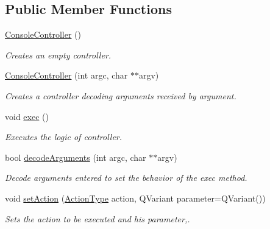 \subsection*{Public Member Functions}
\begin{DoxyCompactItemize}
\item 
\mbox{\label{classConsoleController_aed7f998b076f322a0c45f0a0e57202c4}} 
\mbox{\hyperlink{classConsoleController_aed7f998b076f322a0c45f0a0e57202c4}{Console\+Controller}} ()
\begin{DoxyCompactList}\small\item\em Creates an empty controller. \end{DoxyCompactList}\item 
\mbox{\hyperlink{classConsoleController_aaf8a775d3f675bcf9e7facd959217fdc}{Console\+Controller}} (int argc, char $\ast$$\ast$argv)
\begin{DoxyCompactList}\small\item\em Creates a controller decoding arguments received by argument. \end{DoxyCompactList}\item 
void \mbox{\hyperlink{classConsoleController_accdfd546eef82cfe4d0942426a3b6fac}{exec}} ()
\begin{DoxyCompactList}\small\item\em Executes the logic of controller. \end{DoxyCompactList}\item 
bool \mbox{\hyperlink{classConsoleController_ab9fdcba75eecb1f28c1fcd3b97183fe8}{decode\+Arguments}} (int argc, char $\ast$$\ast$argv)
\begin{DoxyCompactList}\small\item\em Decode arguments entered to set the behavior of the exec method. \end{DoxyCompactList}\item 
void \mbox{\hyperlink{classConsoleController_a13eaf91bd8d72afeaa3792255983e019}{set\+Action}} (\mbox{\hyperlink{classConsoleController_a6bc36e6ee00aa2da0fd9be549b4251d9}{Action\+Type}} action, Q\+Variant parameter=Q\+Variant())
\begin{DoxyCompactList}\small\item\em Sets the action to be executed and his parameter,. \end{DoxyCompactList}\item 
\mbox{\label{classConsoleController_a771c221ac40cd6441f13c76bd08b6927}} 

\end{DoxyCompactItemize}
